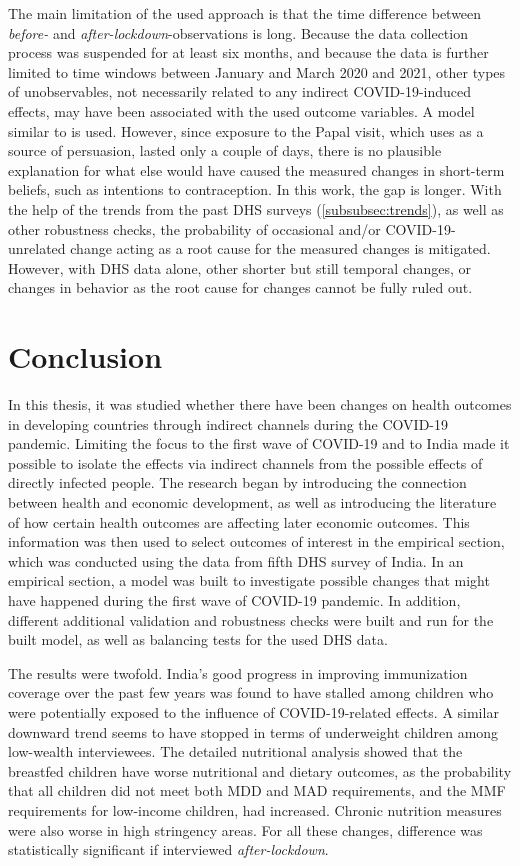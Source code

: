 \documentclass[12pt,a4paper,notitlepage]{article}
\begin{document}
The main limitation of the used approach is that the time difference between \textit{before-} and \textit{after-lockdown}-observations is long. Because the data collection process was suspended for at least six months, and because the data is further limited to time windows between January and March 2020 and 2021, other types of unobservables, not necessarily related to any indirect COVID-19-induced effects, may have been associated with the used outcome variables. A model similar to \citet{Bassi:2017} is used. However, since exposure to the Papal visit, which \citet{Bassi:2017} uses as a source of persuasion, lasted only a couple of days, there is no plausible explanation for what else would have caused the measured changes in short-term beliefs, such as intentions to contraception. In this work, the gap is longer. With the help of the trends from the past DHS surveys (\cref{subsubsec:trends}), as well as other robustness checks, the probability of occasional and/or COVID-19-unrelated change acting as a root cause for the measured changes is mitigated. However, with DHS data alone, other shorter but still temporal changes, or changes in behavior as the root cause for changes cannot be fully ruled out.

\newpage
\section{Conclusion} \label{sec:conclusion}

In this thesis, it was studied whether there have been changes on health outcomes in developing countries through indirect channels during the COVID-19 pandemic. Limiting the focus to the first wave of COVID-19 and to India made it possible to isolate the effects via indirect channels from the possible effects of directly infected people. The research began by introducing the connection between health and economic development, as well as introducing the literature of how certain health outcomes are affecting later economic outcomes. This information was then used to select outcomes of interest in the empirical section, which was conducted using the data from fifth DHS survey of India. In an empirical section, a model was built to investigate possible changes that might have happened during the first wave of COVID-19 pandemic. In addition, different additional validation and robustness checks were built and run for the built model, as well as balancing tests for the used DHS data.

The results were twofold. India's good progress in improving immunization coverage over the past few years was found to have stalled among children who were potentially exposed to the influence of COVID-19-related effects. A similar downward trend seems to have stopped in terms of underweight children among low-wealth interviewees. The detailed nutritional analysis showed that the breastfed children have worse nutritional and dietary outcomes, as the probability that all children did not meet both MDD and MAD requirements, and the MMF requirements for low-income children, had increased. Chronic nutrition measures were also worse in high stringency areas. For all these changes, difference was statistically significant if interviewed \textit{after-lockdown}.
\end{document}
